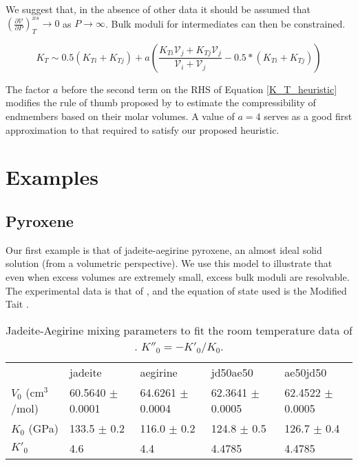 \documentclass[review]{elsarticle}
\begin{document}
We suggest that, in the absence of other data it should be assumed that $\left( \frac{\partial \mathcal{V}}{\partial P} \right)_T^{xs} \rightarrow 0$ as $P \rightarrow \infty$. Bulk moduli for intermediates can then be constrained. 

\begin{equation}
  K_{T} \sim 0.5(K_{Ti} + K_{Tj}) + a \left(\frac{K_{Ti}\mathcal{V}_{j} + K_{Tj}\mathcal{V}_{j}}{\mathcal{V}_{i} + \mathcal{V}_{j}} - 0.5*(K_{Ti} + K_{Tj})\right)
  \label{K_T_heuristic}
\end{equation}

The factor $a$ before the second term on the RHS of Equation \ref{K_T_heuristic} modifies the rule of thumb proposed by \cite{AA1970} to estimate the compressibility of endmembers based on their molar volumes. A value of $a=4$ serves as a good first approximation to that required to satisfy our proposed heuristic.

\section{Examples}
\subsection{Pyroxene}
Our first example is that of jadeite-aegirine pyroxene, an almost ideal solid solution (from a volumetric perspective). We use this model to illustrate that even when excess volumes are extremely small, excess bulk moduli are resolvable. The experimental data is that of \cite{NBLBT2006}, and the equation of state used is the Modified Tait \citep{HP2011}.

\begin{table}[]
\centering
\caption{Jadeite-Aegirine mixing parameters to fit the room temperature data of \cite{NBLBT2006}. $K''_0 = -K'_0/K_0$.}
\label{jd_aeg}
\begin{tabular}{lllll}
                   & jadeite              & aegirine             & jd50ae50             & ae50jd50             \\
$V_0$ (cm$^3$/mol) & 60.5640 $\pm$ 0.0001 & 64.6261 $\pm$ 0.0004 & 62.3641 $\pm$ 0.0005 & 62.4522 $\pm$ 0.0005 \\
$K_0$ (GPa)        & 133.5 $\pm$ 0.2      & 116.0 $\pm$ 0.2      & 124.8 $\pm$ 0.5      & 126.7 $\pm$ 0.4      \\
$K'_0$             & 4.6                  & 4.4                  & 4.4785               & 4.4785              
\end{tabular}
\end{table}
\end{document}
